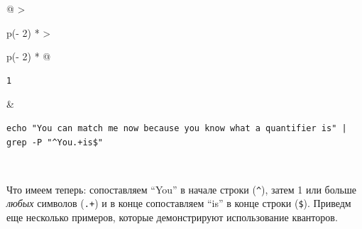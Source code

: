 \documentclass{report}
\begin{document}
\begin{longtable}[]{@{}
  >{\raggedright\arraybackslash}p{(\columnwidth - 2\tabcolsep) * }
  >{\raggedright\arraybackslash}p{(\columnwidth - 2\tabcolsep) * }@{}}
\toprule
\endhead
\begin{minipage}[t]{\linewidth}\raggedright
\begin{verbatim}
1
\end{verbatim}
\end{minipage} & \begin{minipage}[t]{\linewidth}\raggedright
\begin{verbatim}
echo "You can match me now because you know what a quantifier is" | grep -P "^You.+is$"
\end{verbatim}
\end{minipage} \\ \addlinespace
\bottomrule
\end{longtable}

Что имеем теперь: сопоставляем ``You'' в начале строки (\texttt{\^{}}),
затем 1 или больше \emph{любых} символов (\texttt{.+}) и в конце
сопоставляем ``is'' в конце строки (\texttt{\$}). Приведм еще несколько
примеров, которые демонстрируют использование кванторов.
\end{document}
